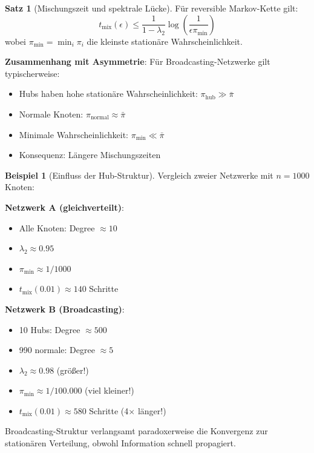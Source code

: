 ﻿\documentclass[a4paper,12pt]{report}
\theoremstyle{definition}
\newtheorem{beispiel}{Beispiel}
\newtheorem{satz}{Satz}
\begin{document}
	\begin{satz}[Mischungszeit und spektrale Lücke]
		Für reversible Markov-Kette gilt:
		\[
		t_{\text{mix}}(\epsilon) \leq \frac{1}{1-\lambda_2} \log\left(\frac{1}{\epsilon \pi_{\min}}\right)
		\]
		wobei $\pi_{\min} = \min_i \pi_i$ die kleinste stationäre Wahrscheinlichkeit.
		
		\textbf{Zusammenhang mit Asymmetrie}:
		Für Broadcasting-Netzwerke gilt typischerweise:
		\begin{itemize}
			\item Hubs haben hohe stationäre Wahrscheinlichkeit: $\pi_{\text{hub}} \gg \bar{\pi}$
			\item Normale Knoten: $\pi_{\text{normal}} \approx \bar{\pi}$
			\item Minimale Wahrscheinlichkeit: $\pi_{\min} \ll \bar{\pi}$
			\item Konsequenz: Längere Mischungszeiten
		\end{itemize}
	\end{satz}
	
	\begin{beispiel}[Einfluss der Hub-Struktur]
		Vergleich zweier Netzwerke mit $n = 1000$ Knoten:
		
		\textbf{Netzwerk A (gleichverteilt)}:
		\begin{itemize}
			\item Alle Knoten: Degree $\approx 10$
			\item $\lambda_2 \approx 0.95$
			\item $\pi_{\min} \approx 1/1000$
			\item $t_{\text{mix}}(0.01) \approx 140$ Schritte
		\end{itemize}
		
		\textbf{Netzwerk B (Broadcasting)}:
		\begin{itemize}
			\item 10 Hubs: Degree $\approx 500$
			\item 990 normale: Degree $\approx 5$
			\item $\lambda_2 \approx 0.98$ (größer!)
			\item $\pi_{\min} \approx 1/100.000$ (viel kleiner!)
			\item $t_{\text{mix}}(0.01) \approx 580$ Schritte (4$\times$ länger!)
		\end{itemize}
		
		Broadcasting-Struktur verlangsamt paradoxerweise die Konvergenz zur stationären Verteilung, obwohl Information schnell propagiert.
	\end{beispiel}
	
\end{document}
